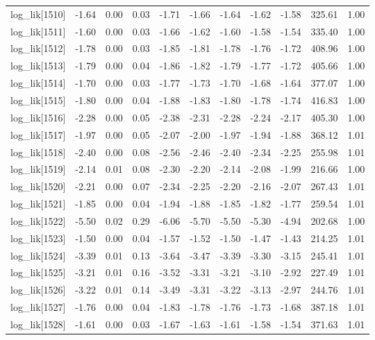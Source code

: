 \begin{table}[ht]
\begin{tabular}{rrrrrrrrrrr}
  log\_lik[1510] & -1.64 & 0.00 & 0.03 & -1.71 & -1.66 & -1.64 & -1.62 & -1.58 & 325.61 & 1.00 \\ 
  log\_lik[1511] & -1.60 & 0.00 & 0.03 & -1.66 & -1.62 & -1.60 & -1.58 & -1.54 & 335.40 & 1.00 \\ 
  log\_lik[1512] & -1.78 & 0.00 & 0.03 & -1.85 & -1.81 & -1.78 & -1.76 & -1.72 & 408.96 & 1.00 \\ 
  log\_lik[1513] & -1.79 & 0.00 & 0.04 & -1.86 & -1.82 & -1.79 & -1.77 & -1.72 & 405.66 & 1.00 \\ 
  log\_lik[1514] & -1.70 & 0.00 & 0.03 & -1.77 & -1.73 & -1.70 & -1.68 & -1.64 & 377.07 & 1.00 \\ 
  log\_lik[1515] & -1.80 & 0.00 & 0.04 & -1.88 & -1.83 & -1.80 & -1.78 & -1.74 & 416.83 & 1.00 \\ 
  log\_lik[1516] & -2.28 & 0.00 & 0.05 & -2.38 & -2.31 & -2.28 & -2.24 & -2.17 & 405.30 & 1.00 \\ 
  log\_lik[1517] & -1.97 & 0.00 & 0.05 & -2.07 & -2.00 & -1.97 & -1.94 & -1.88 & 368.12 & 1.01 \\ 
  log\_lik[1518] & -2.40 & 0.00 & 0.08 & -2.56 & -2.46 & -2.40 & -2.34 & -2.25 & 255.98 & 1.01 \\ 
  log\_lik[1519] & -2.14 & 0.01 & 0.08 & -2.30 & -2.20 & -2.14 & -2.08 & -1.99 & 216.66 & 1.00 \\ 
  log\_lik[1520] & -2.21 & 0.00 & 0.07 & -2.34 & -2.25 & -2.20 & -2.16 & -2.07 & 267.43 & 1.01 \\ 
  log\_lik[1521] & -1.85 & 0.00 & 0.04 & -1.94 & -1.88 & -1.85 & -1.82 & -1.77 & 259.54 & 1.01 \\ 
  log\_lik[1522] & -5.50 & 0.02 & 0.29 & -6.06 & -5.70 & -5.50 & -5.30 & -4.94 & 202.68 & 1.00 \\ 
  log\_lik[1523] & -1.50 & 0.00 & 0.04 & -1.57 & -1.52 & -1.50 & -1.47 & -1.43 & 214.25 & 1.01 \\ 
  log\_lik[1524] & -3.39 & 0.01 & 0.13 & -3.64 & -3.47 & -3.39 & -3.30 & -3.15 & 245.41 & 1.01 \\ 
  log\_lik[1525] & -3.21 & 0.01 & 0.16 & -3.52 & -3.31 & -3.21 & -3.10 & -2.92 & 227.49 & 1.01 \\ 
  log\_lik[1526] & -3.22 & 0.01 & 0.14 & -3.49 & -3.31 & -3.22 & -3.13 & -2.97 & 244.76 & 1.01 \\ 
  log\_lik[1527] & -1.76 & 0.00 & 0.04 & -1.83 & -1.78 & -1.76 & -1.73 & -1.68 & 387.18 & 1.01 \\ 
  log\_lik[1528] & -1.61 & 0.00 & 0.03 & -1.67 & -1.63 & -1.61 & -1.58 & -1.54 & 371.63 & 1.01 \\ 

\end{tabular}
\end{table}

